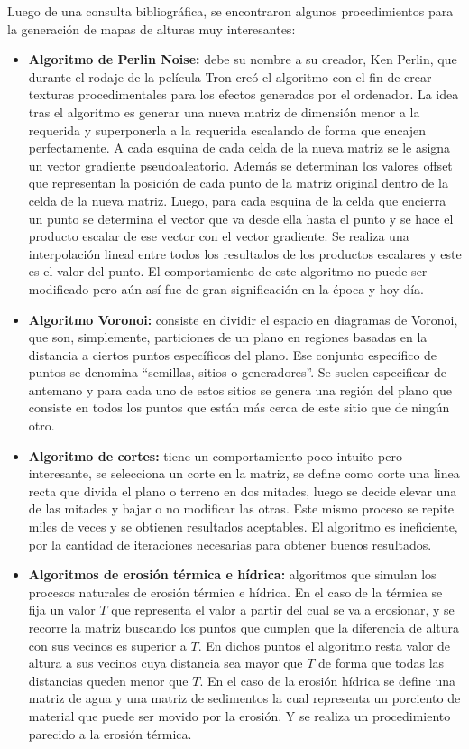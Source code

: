Luego de una consulta bibliográfica, se encontraron algunos procedimientos para la generación de mapas de alturas muy interesantes:

\begin{itemize}
	\item \textbf{Algoritmo de Perlin Noise:} debe su nombre a su creador, Ken Perlin, que durante el rodaje de la película Tron creó el algoritmo con el fin de crear texturas procedimentales para los efectos generados por el ordenador. La idea tras el algoritmo es generar una nueva matriz de dimensión menor a la requerida y superponerla a la requerida escalando de forma que encajen perfectamente. A cada esquina de cada celda de la nueva matriz se le asigna un vector gradiente pseudoaleatorio. Además se determinan los valores offset que representan la posición de cada punto de la matriz original dentro de la celda de la nueva matriz. Luego, para cada esquina de la celda que encierra un punto se determina el vector que va desde ella hasta el punto y se hace el producto escalar de ese vector con el vector gradiente. Se realiza una interpolación lineal entre todos los resultados de los productos escalares y este es el valor del punto. El comportamiento de este algoritmo no puede ser modificado pero aún así fue de gran significación en la época y hoy día.
	\item \textbf{Algoritmo Voronoi:} consiste en dividir el espacio en diagramas de Voronoi, que son, simplemente, particiones de un plano en regiones basadas en la 	distancia a ciertos puntos específicos del plano. Ese conjunto específico de puntos 	se denomina ``semillas, sitios o generadores''. Se suelen especificar de antemano y 	para cada uno de estos sitios se genera una región del plano que consiste en todos 	los puntos que están más cerca de este sitio que de ningún otro. 
	\item \textbf{Algoritmo de cortes:} tiene un comportamiento poco intuito pero interesante, se selecciona un corte en la matriz, se define como corte una linea recta que divida el plano o terreno en dos mitades, luego se decide elevar  una de las mitades y bajar o no modificar las otras. Este mismo proceso se repite miles de veces y se obtienen resultados aceptables. El algoritmo es ineficiente, por la cantidad de iteraciones necesarias para obtener buenos resultados.
	\item \textbf{Algoritmos de erosión térmica e hídrica:} algoritmos que simulan los procesos naturales de erosión térmica e hídrica. En el caso de la térmica se fija un valor $T$ que representa el valor a partir del cual se va a erosionar, y se recorre la matriz buscando los puntos que cumplen que la diferencia de altura con sus vecinos es superior a $T$. En dichos puntos el algoritmo resta valor de altura a sus vecinos cuya distancia sea mayor que $T$ de forma que todas las distancias queden menor que $T$. En el caso de la erosión hídrica se define una matriz de agua y una matriz de sedimentos la cual representa un porciento de material que puede ser movido por la erosión. Y se realiza un procedimiento parecido a la erosión térmica.
\end{itemize}

